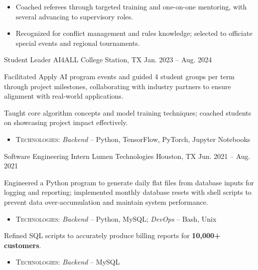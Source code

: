 \begin{cventries}
{\begin{cvitems}
{      \begin{itemize}
      \item Coached referees through targeted training and one-on-one mentoring, with several advancing to supervisory roles.
      \item Recognized for conflict management and rules knowledge; selected to officiate special events and regional tournaments.
      \end{itemize}
      }
    \end{cvitems}
  }
  \cventry
  {Student Leader} %
  {AI4ALL} %
  {College Station, TX} %
  {Jan. 2023 -- Aug. 2024} %
  {
   \begin{cvitems}
    \item {Facilitated Apply AI program events and guided 4 student groups per term through project milestones, collaborating with industry partners to ensure alignment with real-world applications.}
    \item {Taught core algorithm concepts and model training techniques; coached students on showcasing project impact effectively.}
    \begin{itemize}
      \item \textsc{Technologies}: \textit{Backend} – Python, TensorFlow, PyTorch, Jupyter Notebooks
    \end{itemize}
    \end{cvitems}
  }
\cventry
    {Software Engineering Intern} %
    {Lumen Technologies} %
    {Houston, TX} %
    {Jun. 2021 -- Aug. 2021} %
    {
      \begin{cvitems}
      \item {Engineered a Python program to generate daily flat files from database inputs for logging and reporting; implemented monthly database resets with shell scripts to prevent data over-accumulation and maintain system performance.
      \begin{itemize}
      \item \textsc{Technologies}: \textit{Backend} – Python, MySQL; \textit{DevOps} – Bash, Unix
      \end{itemize}
      }
      \item {Refined SQL scripts to accurately produce billing reports for \textbf{10,000+ customers}.
      \begin{itemize}
      \item \textsc{Technologies}: \textit{Backend} – MySQL
      \end{itemize}
      }
      \end{cvitems}
    }
\end{cventries}


